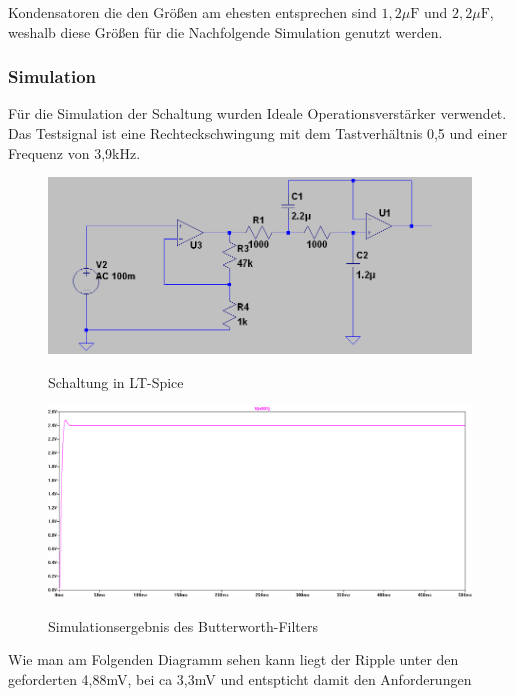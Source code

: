 \documentclass[11pt,twoside,openright]{mpreport}
\begin{document}
Kondensatoren die den Größen am ehesten entsprechen sind $1,2\mu\text{F}$ und $2,2\mu\text{F}$, weshalb diese Größen für die Nachfolgende Simulation genutzt werden.
\subsubsection{Simulation}
Für die Simulation der Schaltung wurden Ideale Operationsverstärker verwendet.
Das Testsignal ist eine Rechteckschwingung mit dem Tastverhältnis 0,5 und einer Frequenz von 3,9kHz.
\begin{figure}[H]
\centering
\includegraphics[width=.96\textwidth]{schaltung.png}\\
\caption{Schaltung in LT-Spice}%
\label{fig:tp-schaltung}
\end{figure}



\begin{figure}[H]
\centering
\includegraphics[width=.96\textwidth]{plott.png}\\
\caption{Simulationsergebnis des Butterworth-Filters}%
\label{fig:tp-plott-bw}
\end{figure}

Wie man am Folgenden Diagramm sehen kann liegt der Ripple unter den geforderten 4,88mV, bei ca 3,3mV und entspticht damit den Anforderungen
\end{document}
